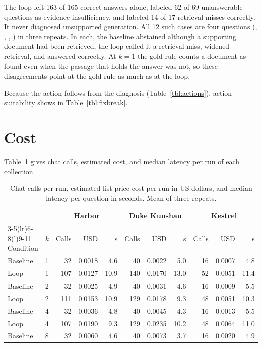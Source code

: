 \documentclass[12pt, a4paper, oneside]{report}
\newcommand{\code}[1]{\texttt{\detokenize{#1}}}
\begin{document}
The loop left 163 of 165 correct answers alone, labeled 62 of 69
unanswerable questions as evidence insufficiency, and labeled 14 of 17
retrieval misses correctly. It never diagnosed unsupported generation. All
12 such cases are four questions (\code{dku-012}, \code{dku-013},
\code{gold-015}, \code{gold-024}) in three repeats. In each, the baseline
abstained although a supporting document had been retrieved, the loop
called it a retrieval miss, widened retrieval, and answered correctly. At
$k=1$ the gold rule counts a document as found even when the passage that
holds the answer was not, so these disagreements point at the gold rule as
much as at the loop.

Because the action follows from the diagnosis (Table~\ref{tbl:actions}),
action suitability shows in Table~\ref{tbl:fixbreak}.

\section{Cost}

Table~\ref{tbl:cost} gives chat calls, estimated cost, and median latency
per run of each collection.

\begin{table}[htbp]
\centering
\footnotesize
\setlength{\tabcolsep}{4pt}
\begin{tabular}{@{}llrrrrrrrrr@{}}
\toprule
 & & \multicolumn{3}{c}{Harbor} & \multicolumn{3}{c}{Duke Kunshan} & \multicolumn{3}{c}{Kestrel} \\
\cmidrule(lr){3-5}\cmidrule(lr){6-8}\cmidrule(l){9-11}
Condition & $k$ & Calls & USD & s & Calls & USD & s & Calls & USD & s \\
\midrule
Baseline & 1 & 32 & 0.0018 & 4.6 & 40 & 0.0022 & 5.0 & 16 & 0.0007 & 4.8 \\
Loop     & 1 & 107 & 0.0127 & 10.9 & 140 & 0.0170 & 13.0 & 52 & 0.0051 & 11.4 \\
Baseline & 2 & 32 & 0.0025 & 4.9 & 40 & 0.0031 & 4.6 & 16 & 0.0009 & 5.5 \\
Loop     & 2 & 111 & 0.0153 & 10.9 & 129 & 0.0178 & 9.3 & 48 & 0.0051 & 10.3 \\
Baseline & 4 & 32 & 0.0036 & 4.8 & 40 & 0.0045 & 4.3 & 16 & 0.0013 & 5.5 \\
Loop     & 4 & 107 & 0.0190 & 9.3 & 129 & 0.0235 & 10.2 & 48 & 0.0064 & 11.0 \\
Baseline & 8 & 32 & 0.0060 & 4.6 & 40 & 0.0073 & 3.7 & 16 & 0.0020 & 4.9 \\
\bottomrule
\end{tabular}
\caption{Chat calls per run, estimated list-price cost per run in US
dollars, and median latency per question in seconds. Mean of three
repeats.}
\label{tbl:cost}
\end{table}
\end{document}
